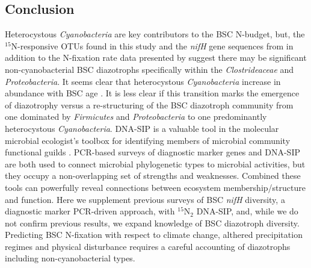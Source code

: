 \subsection{Conclusion}
Heterocystous \textit{Cyanobacteria} are key contributors to the BSC
N-budget, but, the $^{15}$N-responsive OTUs found in this study and the
\textit{nifH} gene sequences from \citet{Steppe_1996} in addition to the
N-fixation rate data presented by \citep{15643930} suggest there may be
significant non-cyanobacterial BSC diazotrophs specifically within the
\textit{Clostrideaceae} and \textit{Proteobacteria}. It seems clear that
heterocystous \textit{Cyanobacteria} increase in abundance with BSC age
\citep{14766579}. It is less clear if this transition marks the emergence of
diazotrophy versus a re-structuring of the BSC diazotroph community from one
dominated by \textit{Firmicutes} and \textit{Proteobacteria} to one
predominantly heterocystous \textit{Cyanobacteria}. DNA-SIP is a valuable tool in the
molecular microbial ecologist's toolbox for identifying members of microbial
community functional guilds \citep{17446886}. PCR-based surveys of diagnostic
marker genes and DNA-SIP are both used to connect microbial phylogenetic
types to microbial activities, but they occupy a non-overlapping set of
strengths and weaknesses.  Combined these tools can powerfully reveal
connections between ecosystem membership/structure and function. Here we
supplement previous surveys of BSC \textit{nifH} diversity, a diagnostic
marker PCR-driven approach, with $^{15}$N$_{2}$ DNA-SIP, and, while we do not
confirm previous results, we expand knowledge of BSC diazotroph diversity.
Predicting BSC N-fixation with respect to climate change, althered 
precipitation regimes and physical disturbance requires a careful accounting of
diazotrophs including non-cyanobacterial types. 
